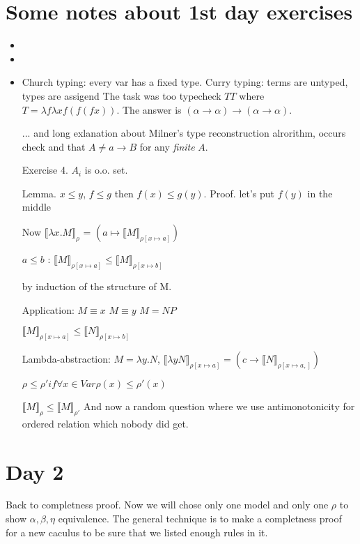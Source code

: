\documentclass[a4paper,10pt]{book}
\newcommand{\sem}[2]{ \llbracket#1\rrbracket_{#2} }
\begin{document}
\section{Some notes about 1st day exercises}
\begin{itemize}
 \item 
 \item 
 \item Church typing: every var has a fixed type. Curry typing: terms are untyped, types are assigend
 The task was too typecheck $TT$ where $T=\lambda f \lambda x f(f(f x))$. The answer is 
 $(\alpha \rightarrow \alpha) \rightarrow (\alpha \rightarrow \alpha)$.
 
\begin{prooftree}
\end{prooftree}
... and long exlanation about Milner's type reconstruction alrorithm, occurs check and that 
$A \neq a \rightarrow B$ for any \textit{finite} $A$.

Exercise 4.
$A_i$ is o.o. set. 


Lemma. $x \leq y$, $f \leq g$ then $f(x) \leq g(y)$.  Proof. let's put $f(y)$ in the middle



Now 
$\sem{\lambda x . M}{\rho}$ = $(a \mapsto \sem{M}{\rho[x \mapsto a]})$ 

$a \leq b$ : $\sem{M}{\rho[x \mapsto a]} \leq \sem{M}{\rho[x \mapsto b]}$

by induction of the structure of M.

Application: $M \equiv x$ $M\equiv y$ $M=NP$

$\sem{M}{\rho[x \mapsto a]} \leq \sem{N}{\rho[x \mapsto b]}$ 

Lambda-abstraction:
$M = \lambda y . N$, $\sem{\lambda y N}{\rho[x \mapsto a]} = (c \rightarrow \sem{N}{\rho[x\mapsto a, ]})$

$\rho \leq \rho' if \forall x \in Var \rho(x) \leq \rho'(x)$

$\sem{M}{\rho} \leq \sem{M}{\rho'}$ And now a random question where we use antimonotonicity for ordered relation 
which nobody did get.


\end{itemize}


\section{Day 2}
Back to completness proof. Now we will chose only one model and only one $\rho$ to show 
$\alpha, \beta, \eta$ equivalence. The general technique is to make a completness proof for a new caculus 
to be sure that we listed enough rules in it.
\end{document}
